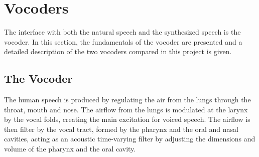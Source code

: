 \section{Vocoders}
\label{vocoders}
The interface with both the natural speech and the synthesized speech is the vocoder. In this section, the fundamentals of the vocoder are presented and a detailed description of the two vocoders compared in this project is given.

\subsection{The Vocoder}
\label{vocoders_vocoder}
The human speech is produced by regulating the air from the lungs through the throat, mouth and nose. The airflow from the lungs is modulated at the larynx by the vocal folds, creating the main excitation for voiced speech. The airflow is then filter by the vocal tract, formed by the pharynx and the oral and nasal cavities, acting as an acoustic time-varying filter by adjusting the dimensions and volume of the pharynx and the oral cavity.

